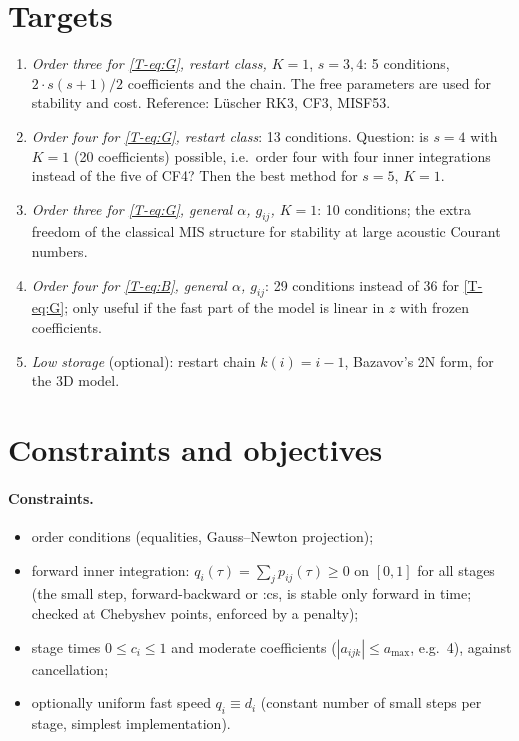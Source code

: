 \documentclass[11pt,a4paper]{article}
\begin{document}
\section{Targets}

\begin{enumerate}[label=T\arabic*]
\item \emph{Order three for \eqref{T-eq:G}, restart class, $K=1$}, $s=3,4$: 5 conditions, $2\cdot s(s+1)/2$ coefficients and
  the chain. The free parameters are used for stability and cost. Reference: Lüscher RK3, CF3, MISF53.
\item \emph{Order four for \eqref{T-eq:G}, restart class}: 13 conditions. Question: is $s=4$ with $K=1$ (20 coefficients)
  possible, i.e.\ order four with four inner integrations instead of the five of CF4? Then the best method for $s=5$,
  $K=1$.
\item \emph{Order three for \eqref{T-eq:G}, general $\alpha$, $g_{ij}$, $K=1$}: 10 conditions; the extra freedom of the
  classical MIS structure for stability at large acoustic Courant numbers.
\item \emph{Order four for \eqref{T-eq:B}, general $\alpha$, $g_{ij}$}: 29 conditions instead of 36 for \eqref{T-eq:G}; only
  useful if the fast part of the model is linear in $z$ with frozen coefficients.
\item \emph{Low storage} (optional): restart chain $k(i)=i-1$, Bazavov's 2N form, for the 3D model.
\end{enumerate}

\section{Constraints and objectives}

\paragraph{Constraints.}
\begin{itemize}
\item order conditions (equalities, Gauss--Newton projection);
\item forward inner integration: $q_i(\tau)=\sum_jp_{ij}(\tau)\ge0$ on $[0,1]$ for all stages (the small step,
  forward-backward or :cs, is stable only forward in time; checked at Chebyshev points, enforced by a penalty);
\item stage times $0\le c_i\le1$ and moderate coefficients ($|a_{ijk}|\le a_{\max}$, e.g.\ 4), against cancellation;
\item optionally uniform fast speed $q_i\equiv d_i$ (constant number of small steps per stage, simplest implementation).
\end{itemize}
\end{document}
